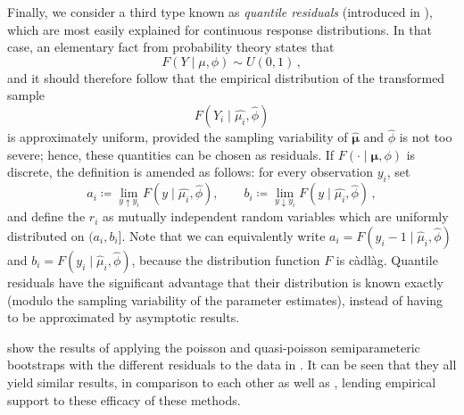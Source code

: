 \documentclass[a4paper]{book}
\begin{document}
Finally, we consider a third type known as \emph{quantile residuals} (introduced in \cite{dunn:rand-quant-res}), which are most easily explained for continuous response distributions. In that case, an elementary fact from probability theory states that
\begin{equation}
  F(Y \mid \mu, \phi) \sim U(0, 1) \,,
\end{equation}
and it should therefore follow that the empirical distribution of the transformed sample
\begin{equation}
  F(Y_i \mid \widehat{\mu_i}, \widehat{\phi})
\end{equation}
is approximately uniform, provided the sampling variability of $\bm{\widehat{\mu}}$ and $\widehat{\phi}$ is not too severe; hence, these quantities can be chosen as residuals. If $F(\cdot \mid \bm{\mu}, \phi)$ is discrete, the definition is amended as follows: for every observation $y_i$, set
\begin{equation}
  a_i \coloneqq \lim_{y \uparrow y_i} F(y \mid \widehat{\mu_i}, \widehat{\phi}), \qquad b_i \coloneqq \lim_{y \downarrow y_i} F(y \mid \widehat{\mu_i}, \widehat{\phi}) \,,
\end{equation}
and define the $r_i$ as mutually independent random variables which are uniformly distributed on $(a_i, b_i]$. Note that we can equivalently write $a_i = F(y_i - 1 \mid \widehat{\mu}_i, \widehat{\phi})$ and $b_i = F(y_i \mid \widehat{\mu}_i, \widehat{\phi})$, because the distribution function $F$ is c\`adl\`ag. Quantile residuals have the significant advantage that their distribution is known exactly (modulo the sampling variability of the parameter estimates), instead of having to be approximated by asymptotic results.

 show the results of applying the poisson and quasi-poisson semiparameteric bootstraps with the different residuals to the data in . It can be seen that they all yield similar results, in comparison to each other as well as , lending empirical support to these efficacy of these methods. 
\end{document}
